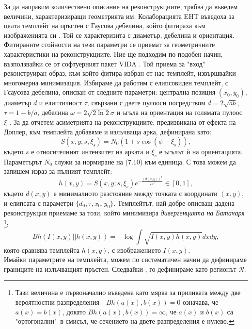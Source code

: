 За да направим количествено описание на реконструкциите, трябва да въведем величини, характеризиращи геометрията им. Колаборацията EHT въведоха за целта темплейт на пръстен с Гаусова дебелина, който фитираха към изображенията си \cite{EHT_M87_VI}. Той се характеризита с диаметър, дебелина и ориентация. Фитираните стойности на тези параметри се приемат за геометричните характеристики на реконструкциите. Ние ще подходим по подобен начин, възползвайки се от софтуерният пакет VIDA \cite{VIDA}. Той приема за "вход"$\,$ реконструиран образ, към който фитира избран от нас темплейт, извършвайки многомерна минимизация. Избираме да работим с елипсовиден темплейт, с Гсаусова дебелина, описван от следните параметри: централна позиция $(x_0,y_0)$, диаметър $d$ и елиптичност $\tau$, свързани с двете пулооси посредством $d = 2\sqrt{ab}$, $\tau = 1 - b/a$, дебелина $\mathcal{\omega} = 2\sqrt{2\ln2}\sigma$ и ъгъла на ориентация на голямата пулоос $\xi_\tau$. За да отчетем асиметрията на реконструкциите, предизвикана от ефекта на Доплер, към темплейта добавяме и излъчваща арка, дефинирана като:
\begin{equation}
	S(x,y;s,\xi_s) = N_0(1 + s\cos(\phi - \xi_s)),
\end{equation}
където $s$ е относителният интензитет на арката и $\xi_s$ е ъгълът ѝ на ориентацията. Параметърът $N_0$ служи за нормиране на (7.10) към единица. С това можем да запишем израз за пълният темплейт:
\begin{equation}
	h(x,y) = S(x,y;s,\xi_s)e^{-\frac{(d(x,y))^2}{2\sigma^2}}\in[0,1],
\end{equation}
където $d(x,y)$ е минималното разстояние между точката с координати $(x,y)$, и елипсата с параметри $\{d_0,\tau,x_0,y_0\}$. Темплейтът, най-добре описващ дадена реконструкция приемаме за този, който минимизира \emph{дивергенцията на Батачаря} \footnote{Тази величина е първоначално въведена като мярка за приликата между две вероятностни разпределения - $Bh(a(x),b(x)) = 0$ означава, че $a(x) = b(x)$, докато $Bh(a(x), b(x)) = \infty$, че $a(x)$ и $b(x)$ са "ортогонални"$\,$ в смисъл, че сечението на двете разпределения е нулево.}:
\begin{equation}
	Bh\left(I(x,y)||h(x,y)\right)= -\log\int\sqrt{I(x,y)h(x,y)}dxdy,
\end{equation}
която сравнява темплейта $h(x,y)$, с изображението $I(x,y)$.\\

Имайки параметрите на темплейта, можем по систематичен начин да дефинираме границите на излъчващият пръстен. Следвайки \cite{Eichhorn2022}, го дефинираме като регионът $\mathcal{R}$:

